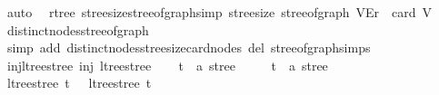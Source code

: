 \begin{isabellebody}
\ auto\isanewline
{}\isamarkupfalse%
%
\endisatagproof
{\isafoldproof}%
%
\isadelimproof
\isanewline
%
\endisadelimproof
\isanewline
{}\isamarkupfalse%
\ {\isacharparenleft}{\kern0pt}\ rtree{\isacharparenright}{\kern0pt}\ stree{\isacharunderscore}{\kern0pt}size{\isacharunderscore}{\kern0pt}stree{\isacharunderscore}{\kern0pt}of{\isacharunderscore}{\kern0pt}graph{\isacharbrackleft}{\kern0pt}simp{\isacharbrackright}{\kern0pt}{\isacharcolon}{\kern0pt}\ {\isachardoublequoteopen}stree{\isacharunderscore}{\kern0pt}size\ {\isacharparenleft}{\kern0pt}stree{\isacharunderscore}{\kern0pt}of{\isacharunderscore}{\kern0pt}graph\ {\isacharparenleft}{\kern0pt}V{\isacharcomma}{\kern0pt}E{\isacharcomma}{\kern0pt}r{\isacharparenright}{\kern0pt}{\isacharparenright}{\kern0pt}\ {\isacharequal}{\kern0pt}\ card\ V{\isachardoublequoteclose}\isanewline
%
\isadelimproof
\ \ %
\endisadelimproof
%
\isatagproof
{}\isamarkupfalse%
\ distinct{\isacharunderscore}{\kern0pt}nodes{\isacharunderscore}{\kern0pt}stree{\isacharunderscore}{\kern0pt}of{\isacharunderscore}{\kern0pt}graph\ \isamarkupfalse%
\ {\isacharparenleft}{\kern0pt}simp\ add{\isacharcolon}{\kern0pt}\ distinct{\isacharunderscore}{\kern0pt}nodes{\isacharunderscore}{\kern0pt}stree{\isacharunderscore}{\kern0pt}size{\isacharunderscore}{\kern0pt}card{\isacharunderscore}{\kern0pt}nodes\ del{\isacharcolon}{\kern0pt}\ stree{\isacharunderscore}{\kern0pt}of{\isacharunderscore}{\kern0pt}graph{\isachardot}{\kern0pt}simps{\isacharparenright}{\kern0pt}%
\endisatagproof
{\isafoldproof}%
%
\isadelimproof
\isanewline
%
\endisadelimproof
\isanewline
{}\isamarkupfalse%
\ inj{\isacharunderscore}{\kern0pt}ltree{\isacharunderscore}{\kern0pt}stree{\isacharcolon}{\kern0pt}\ {\isachardoublequoteopen}inj\ ltree{\isacharunderscore}{\kern0pt}stree{\isachardoublequoteclose}\isanewline
%
\isadelimproof
%
\endisadelimproof
%
\isatagproof
{}\isamarkupfalse%
\isanewline
\ \ \isamarkupfalse%
\ t{}\ {\isacharcolon}{\kern0pt}{\isacharcolon}{\kern0pt}\ {\isachardoublequoteopen}{\isacharprime}{\kern0pt}a\ stree{\isachardoublequoteclose}\isanewline
\ \ \ \ \ t{}\ {\isacharcolon}{\kern0pt}{\isacharcolon}{\kern0pt}\ {\isachardoublequoteopen}{\isacharprime}{\kern0pt}a\ stree{\isachardoublequoteclose}\isanewline
\ \ \isamarkupfalse%
\ {\isachardoublequoteopen}ltree{\isacharunderscore}{\kern0pt}stree\ t{}\ {\isacharequal}{\kern0pt}\ \ ltree{\isacharunderscore}{\kern0pt}stree\ t{}{\isachardoublequoteclose}\isanewline

\end{isabellebody}
